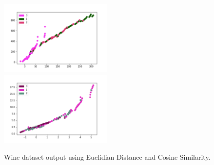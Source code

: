 \documentclass[a4paper]{article}
\begin{document}
  \begin{figure}[htb]
    \includegraphics[width=0.5\textwidth]{../output/wine_euclidian_distance_1.png}
    \includegraphics[width=0.5\textwidth]{../output/wine_angle_1.png}
    \caption{Wine dataset output using Euclidian Distance and Cosine Similarity.}
    \label{wine}
  \end{figure}
  
  \newpage
  \printbibliography
\end{document}
